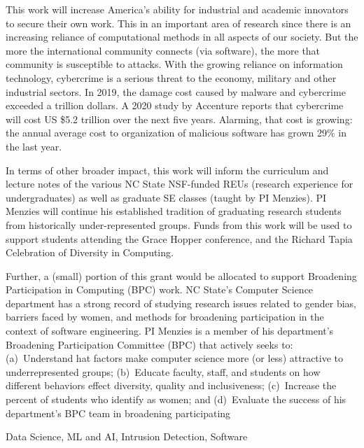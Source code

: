 \begin{nsfsummary}
 
 
 This work will increase America’s ability for industrial and academic innovators to secure their own
 work.  
This in an important area of research since there  is an increasing reliance of
computational methods in all aspects of our society. 
But the more the international community connects (via software), the more that community
is susceptible to attacks. 
With the growing reliance on information technology, cybercrime is a serious threat to the economy, military and other industrial sectors.
In 2019, the damage cost caused by malware and cybercrime exceeded a trillion dollars. A 2020 study by Accenture reports that cybercrime will cost US \$5.2 trillion over the next five years. Alarming, that cost is growing: the annual average cost to organization of malicious software has grown 29\% in the last year. 



 
 
 In terms of other broader impact,
 this work will inform the curriculum  and lecture notes of the various NC State NSF-funded REUs (research experience for undergraduates) as well as graduate
SE classes (taught by PI Menzies). 
PI  Menzies  will  continue  his  established  tradition  of  graduating  research  students  from  historically under-represented  groups.   
Funds from this work will be used to support students attending the Grace Hopper conference,
and the Richard Tapia Celebration  of Diversity in Computing.

Further,  a (small) portion of this grant would be allocated to support Broadening Participation in Computing (BPC) work. NC  State’s  Computer  Science  department  has  a  strong  record  of  studying research issues related to gender bias,  barriers faced by women, and methods for broadening participation    in  the  context  of  software  engineering.   PI  Menzies  is  a  member  of  his  department’s Broadening Participation Committee (BPC) that actively seeks to:  (a)~Understand hat factors make computer science more (or less) attractive to underrepresented groups; (b)~Educate faculty, staff, and students on how different behaviors effect diversity, quality and inclusiveness; (c)~Increase the percent of students who identify as women; and (d)~Evaluate the success of his department’s BPC team in broadening participating

 

 
 
 
 
 
 


Data Science, ML and AI,
Intrusion Detection,
Software

\end{nsfsummary}